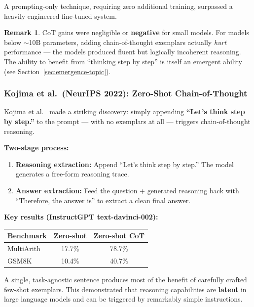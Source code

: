 \documentclass[11pt, a4paper]{article}
\theoremstyle{definition}
\newtheorem{remark}{Remark}[section]
\theoremstyle{plain}
\begin{document}
A prompting-only technique, requiring zero additional training, surpassed a heavily engineered fine-tuned system.

\begin{remark}
CoT gains were negligible or \textbf{negative} for small models. For models below ${\sim}$10B parameters, adding chain-of-thought exemplars actually \emph{hurt} performance --- the models produced fluent but logically incoherent reasoning. The ability to benefit from ``thinking step by step'' is itself an emergent ability (see Section~\ref{sec:emergence-topic}).
\end{remark}

\subsubsection{Kojima et al.\ (NeurIPS 2022): Zero-Shot Chain-of-Thought}

Kojima et al.~\cite{kojima2022zeroshotcot} made a striking discovery: simply appending \textbf{``Let's think step by step.''} to the prompt --- with no exemplars at all --- triggers chain-of-thought reasoning.

\textbf{Two-stage process:}
\begin{enumerate}
  \item \textbf{Reasoning extraction:} Append ``Let's think step by step.'' The model generates a free-form reasoning trace.
  \item \textbf{Answer extraction:} Feed the question + generated reasoning back with ``Therefore, the answer is'' to extract a clean final answer.
\end{enumerate}

\textbf{Key results (InstructGPT text-davinci-002):}
\begin{center}
\begin{tabular}{lcc}
  \toprule
  \textbf{Benchmark} & \textbf{Zero-shot} & \textbf{Zero-shot CoT} \\
  \midrule
  MultiArith & 17.7\% & 78.7\% \\
  GSM8K & 10.4\% & 40.7\% \\
  \bottomrule
\end{tabular}
\end{center}

A single, task-agnostic sentence produces most of the benefit of carefully crafted few-shot exemplars. This demonstrated that reasoning capabilities are \textbf{latent} in large language models and can be triggered by remarkably simple instructions.
\end{document}
